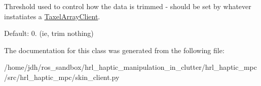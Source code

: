 \-Threshold used to control how the data is trimmed -\/ should be set by whatever instatiates a \hyperlink{classhrl__haptic__mpc_1_1skin__client_1_1_taxel_array_client}{\-Taxel\-Array\-Client}. 

\-Default\-: 0. (ie, trim nothing) 

\-The documentation for this class was generated from the following file\-:\begin{DoxyCompactItemize}
\item 
/home/jdh/ros\-\_\-sandbox/hrl\-\_\-haptic\-\_\-manipulation\-\_\-in\-\_\-clutter/hrl\-\_\-haptic\-\_\-mpc/src/hrl\-\_\-haptic\-\_\-mpc/skin\-\_\-client.\-py\end{DoxyCompactItemize}
